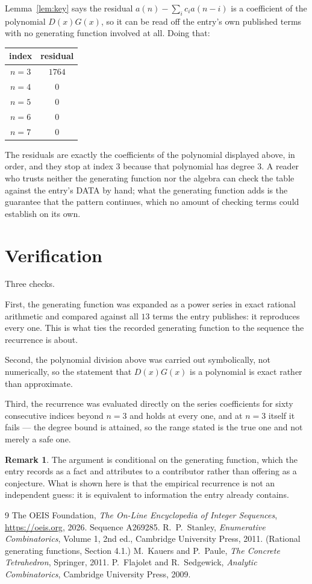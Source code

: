 \documentclass[11pt,a4paper]{article}
\theoremstyle{plain}
\theoremstyle{definition}
\newtheorem{remark}[theorem]{Remark}
\begin{document}
Lemma~\ref{lem:key} says the residual $a(n)-\sum_ic_ia(n-i)$ is a coefficient of the
polynomial $D(x)G(x)$, so it can be read off the entry's own published terms with no
generating function involved at all. Doing that:
\begin{center}
\begin{tabular}{cc}
index & residual \\ \hline
$n=3$ & $1764$ \\
$n=4$ & $0$ \\
$n=5$ & $0$ \\
$n=6$ & $0$ \\
$n=7$ & $0$
\end{tabular}
\end{center}
The residuals are exactly the coefficients of the polynomial displayed above, in order, and
they stop at index $3$ because that polynomial has degree $3$. A reader who trusts
neither the generating function nor the algebra can check the table against the entry's DATA
by hand; what the generating function adds is the guarantee that the pattern continues, which
no amount of checking terms could establish on its own.

\section{Verification}

Three checks.

First, the generating function was expanded as a power series in exact rational arithmetic and
compared against all $13$ terms the entry publishes: it reproduces every one. This is
what ties the recorded generating function to the sequence the recurrence is about.

Second, the polynomial division above was carried out symbolically, not numerically, so the
statement that $D(x)G(x)$ is a polynomial is exact rather than approximate.

Third, the recurrence was evaluated directly on the series coefficients for sixty consecutive
indices beyond $n=3$ and holds at every one, and at $n=3$ itself it fails --- the
degree bound is attained, so the range stated is the true one and not merely a safe one.

\begin{remark}
The argument is conditional on the generating function, which the entry records as a fact and
attributes to a contributor rather than offering as a conjecture. What is shown here is that
the empirical recurrence is not an independent guess: it is equivalent to information the
entry already contains.
\end{remark}

\begin{thebibliography}{9}
 The OEIS Foundation, \emph{The On-Line Encyclopedia of Integer
Sequences}, \url{https://oeis.org}, 2026. Sequence A269285.
 R.~P.~Stanley, \emph{Enumerative Combinatorics}, Volume 1, 2nd ed.,
Cambridge University Press, 2011. (Rational generating functions, Section 4.1.)
 M.~Kauers and P.~Paule, \emph{The Concrete Tetrahedron}, Springer, 2011.
 P.~Flajolet and R.~Sedgewick, \emph{Analytic Combinatorics}, Cambridge
University Press, 2009.
\end{thebibliography}
\end{document}
